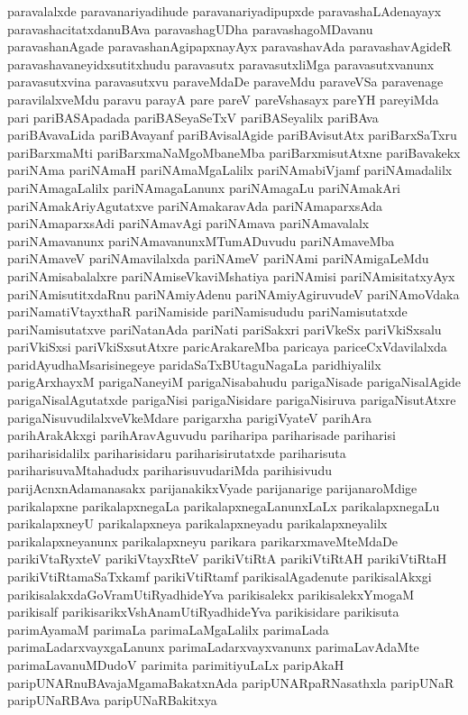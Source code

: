 {paravalalxde
paravanariyadihude
paravanariyadipupxde
paravashaLAdenayayx
paravashacitatxdanuBAva
paravashagUDha
paravashagoMDavanu
paravashanAgade
paravashanAgipapxnayAyx
paravashavAda
paravashavAgideR
paravashavaneyidxsutitxhudu
paravasutx
paravasutxliMga
paravasutxvanunx
paravasutxvina
paravasutxvu
paraveMdaDe
paraveMdu
paraveVSa
paravenage
paravilalxveMdu
paravu
parayA
pare
pareV
pareVshasayx
pareYH
pareyiMda
pari
pariBASApadada
pariBASeyaSeTxV
pariBASeyalilx
pariBAva
pariBAvavaLida
pariBAvayanf
pariBAvisalAgide
pariBAvisutAtx
pariBarxSaTxru
pariBarxmaMti
pariBarxmaNaMgoMbaneMba
pariBarxmisutAtxne
pariBavakekx
pariNAma
pariNAmaH
pariNAmaMgaLalilx
pariNAmabiVjamf
pariNAmadalilx
pariNAmagaLalilx
pariNAmagaLanunx
pariNAmagaLu
pariNAmakAri
pariNAmakAriyAgutatxve
pariNAmakaravAda
pariNAmaparxsAda
pariNAmaparxsAdi
pariNAmavAgi
pariNAmava
pariNAmavalalx
pariNAmavanunx
pariNAmavanunxMTumADuvudu
pariNAmaveMba
pariNAmaveV
pariNAmavilalxda
pariNAmeV
pariNAmi
pariNAmigaLeMdu
pariNAmisabalalxre
pariNAmiseVkaviMshatiya
pariNAmisi
pariNAmisitatxyAyx
pariNAmisutitxdaRnu
pariNAmiyAdenu
pariNAmiyAgiruvudeV
pariNAmoVdaka
pariNamatiVtayxthaR
pariNamiside
pariNamisududu
pariNamisutatxde
pariNamisutatxve
pariNatanAda
pariNati
pariSakxri
pariVkeSx
pariVkiSxsalu
pariVkiSxsi
pariVkiSxsutAtxre
paricArakareMba
paricaya
pariceCxVdavilalxda
paridAyudhaMsarisinegeye
paridaSaTxBUtaguNagaLa
paridhiyalilx
parigArxhayxM
parigaNaneyiM
parigaNisabahudu
parigaNisade
parigaNisalAgide
parigaNisalAgutatxde
parigaNisi
parigaNisidare
parigaNisiruva
parigaNisutAtxre
parigaNisuvudilalxveVkeMdare
parigarxha
parigiVyateV
parihAra
parihArakAkxgi
parihAravAguvudu
pariharipa
pariharisade
pariharisi
pariharisidalilx
pariharisidaru
pariharisirutatxde
pariharisuta
pariharisuvaMtahadudx
pariharisuvudariMda
parihisivudu
parijAcnxnAdamanasakx
parijanakikxVyade
parijanarige
parijanaroMdige
parikalapxne
parikalapxnegaLa
parikalapxnegaLanunxLaLx
parikalapxnegaLu
parikalapxneyU
parikalapxneya
parikalapxneyadu
parikalapxneyalilx
parikalapxneyanunx
parikalapxneyu
parikara
parikarxmaveMteMdaDe
parikiVtaRyxteV
parikiVtayxRteV
parikiVtiRtA
parikiVtiRtAH
parikiVtiRtaH
parikiVtiRtamaSaTxkamf
parikiVtiRtamf
parikisalAgadenute
parikisalAkxgi
parikisalakxdaGoVramUtiRyadhideYva
parikisalekx
parikisalekxYmogaM
parikisalf
parikisarikxVshAnamUtiRyadhideYva
parikisidare
parikisuta
parimAyamaM
parimaLa
parimaLaMgaLalilx
parimaLada
parimaLadarxvayxgaLanunx
parimaLadarxvayxvanunx
parimaLavAdaMte
parimaLavanuMDudoV
parimita
parimitiyuLaLx
paripAkaH
paripUNARnuBAvajaMgamaBakatxnAda
paripUNARpaRNasathxla
paripUNaR
paripUNaRBAva
paripUNaRBakitxya
}
